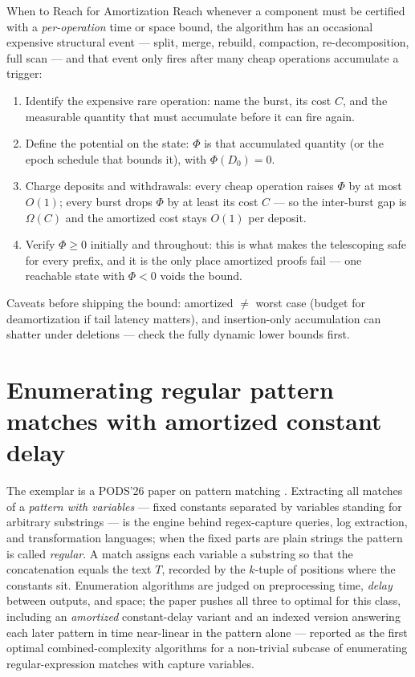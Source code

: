 \begin{reachbox}{When to Reach for Amortization}
Reach whenever a component must be certified with a \emph{per-operation}
time or space bound, the algorithm has an occasional expensive structural
event --- split, merge, rebuild, compaction, re-decomposition, full scan ---
and that event only fires after many cheap operations accumulate a trigger:
\begin{enumerate}
\item Identify the expensive rare operation: name the burst, its cost $C$,
  and the measurable quantity that must accumulate before it can fire again.
\item Define the potential on the state: $\Phi$ is that accumulated quantity
  (or the epoch schedule that bounds it), with $\Phi(D_0) = 0$.
\item Charge deposits and withdrawals: every cheap operation raises $\Phi$ by
  at most $O(1)$; every burst drops $\Phi$ by at least its cost $C$ --- so
  the inter-burst gap is $\Omega(C)$ and the amortized cost stays $O(1)$ per
  deposit.
\item Verify $\Phi \ge 0$ initially and throughout: this is what makes the
  telescoping safe for every prefix, and it is the only place amortized
  proofs fail --- one reachable state with $\Phi < 0$ voids the bound.
\end{enumerate}
Caveats before shipping the bound: amortized $\ne$ worst case (budget for
deamortization if tail latency matters), and insertion-only accumulation can
shatter under deletions --- check the fully dynamic lower bounds first.
\end{reachbox}

\section{Enumerating regular pattern matches with amortized constant delay}
\label{sec:amo-enum}

The exemplar is a PODS'26 paper on pattern matching \citep{sigmod26-177}\pods.
Extracting all matches of a \emph{pattern with variables} --- fixed
constants separated by variables standing for arbitrary substrings --- is
the engine behind regex-capture queries, log extraction, and transformation
languages; when the fixed parts are plain strings the pattern is called
\emph{regular}. A match assigns each variable a substring so that the
concatenation equals the text $T$, recorded by the $k$-tuple of positions
where the constants sit. Enumeration algorithms are judged on preprocessing
time, \emph{delay} between outputs, and space; the paper pushes all three to
optimal for this class, including an \emph{amortized} constant-delay
variant and an indexed version answering each later pattern in time
near-linear in the pattern alone --- reported as the first optimal
combined-complexity algorithms for a non-trivial subcase of enumerating
regular-expression matches with capture variables.

